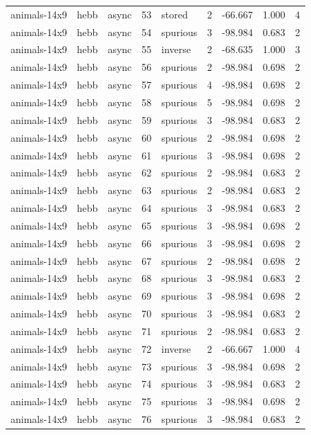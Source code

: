 \begin{tabular}{lllrlrrrr}
animals-14x9 & hebb & async & 53 & stored & 2 & -66.667 & 1.000 & 4 \\
animals-14x9 & hebb & async & 54 & spurious & 3 & -98.984 & 0.683 & 2 \\
animals-14x9 & hebb & async & 55 & inverse & 2 & -68.635 & 1.000 & 3 \\
animals-14x9 & hebb & async & 56 & spurious & 2 & -98.984 & 0.698 & 2 \\
animals-14x9 & hebb & async & 57 & spurious & 4 & -98.984 & 0.698 & 2 \\
animals-14x9 & hebb & async & 58 & spurious & 5 & -98.984 & 0.698 & 2 \\
animals-14x9 & hebb & async & 59 & spurious & 3 & -98.984 & 0.683 & 2 \\
animals-14x9 & hebb & async & 60 & spurious & 2 & -98.984 & 0.698 & 2 \\
animals-14x9 & hebb & async & 61 & spurious & 3 & -98.984 & 0.698 & 2 \\
animals-14x9 & hebb & async & 62 & spurious & 2 & -98.984 & 0.683 & 2 \\
animals-14x9 & hebb & async & 63 & spurious & 2 & -98.984 & 0.683 & 2 \\
animals-14x9 & hebb & async & 64 & spurious & 3 & -98.984 & 0.683 & 2 \\
animals-14x9 & hebb & async & 65 & spurious & 3 & -98.984 & 0.698 & 2 \\
animals-14x9 & hebb & async & 66 & spurious & 3 & -98.984 & 0.698 & 2 \\
animals-14x9 & hebb & async & 67 & spurious & 2 & -98.984 & 0.698 & 2 \\
animals-14x9 & hebb & async & 68 & spurious & 3 & -98.984 & 0.683 & 2 \\
animals-14x9 & hebb & async & 69 & spurious & 3 & -98.984 & 0.698 & 2 \\
animals-14x9 & hebb & async & 70 & spurious & 3 & -98.984 & 0.683 & 2 \\
animals-14x9 & hebb & async & 71 & spurious & 2 & -98.984 & 0.683 & 2 \\
animals-14x9 & hebb & async & 72 & inverse & 2 & -66.667 & 1.000 & 4 \\
animals-14x9 & hebb & async & 73 & spurious & 3 & -98.984 & 0.698 & 2 \\
animals-14x9 & hebb & async & 74 & spurious & 3 & -98.984 & 0.683 & 2 \\
animals-14x9 & hebb & async & 75 & spurious & 3 & -98.984 & 0.698 & 2 \\
animals-14x9 & hebb & async & 76 & spurious & 3 & -98.984 & 0.683 & 2 \\

\end{tabular}
